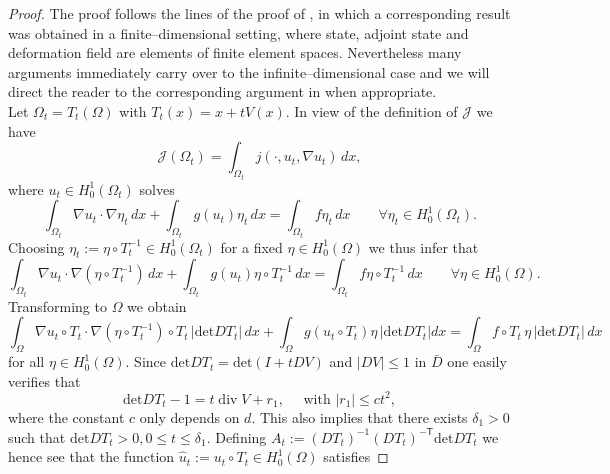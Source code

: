 \documentclass[a4paper,10pt]{article}
\newcommand{\dx}{\,dx}
\theoremstyle{plain}
\theoremstyle{plain}
\numberwithin{equation}{section}
\DeclareMathOperator{\Div}{div}
\begin{document}
\begin{proof}
The proof follows the lines of the proof of \cite[Lemma 3.2]{DHH25-convergence}, in which
a corresponding result was obtained in a finite--dimensional setting, where
state, adjoint state and deformation field are elements of finite element spaces. 
Nevertheless many arguments immediately carry over to the infinite--dimensional case and
we will direct the reader to the corresponding argument in \cite{DHH25-convergence}
when appropriate. \\
Let $\Omega_t=T_t(\Omega)$ with $T_t(x)=x+t V(x)$. In view of the definition of $\mathcal J$
we have
\begin{displaymath}
\mathcal J(\Omega_t) = \int_{\Omega_t} j(\cdot,u_t,\nabla u_t)  \dx,
\end{displaymath}
where $u_t \in H^1_0(\Omega_t)$ solves
\begin{displaymath}  
\int_{\Omega_t} \nabla u_t \cdot \nabla \eta_t  \dx + \int_{\Omega_t} g(u_t) \eta_t \dx = \int_{\Omega_t} f \eta_t  \dx \qquad \forall \eta_t \in H^1_0(\Omega_t).
\end{displaymath}
Choosing $\eta_t:= \eta \circ T_t^{-1} \in H^1_0(\Omega_t)$ for a fixed $\eta \in H^1_0(\Omega)$ we thus infer that 
\begin{equation}  \label{hatuht}
\int_{\Omega_t} \nabla u_t \cdot \nabla (\eta \circ T_t^{-1})  \dx + \int_{\Omega_t} g(u_t) \eta \circ T_t^{-1} \dx = \int_{\Omega_t} f \eta \circ T_t^{-1}  \dx \qquad
\forall  \eta \in H^1_0(\Omega).
\end{equation}
Transforming to $\Omega$ we obtain
\begin{equation} \label{uhtrel}
\int_{\Omega} \nabla u_t \circ T_t \cdot \nabla (\eta \circ T_t^{-1}) \circ T_t \, | \mbox{det} D T_t |  \dx + \int_{\Omega} g(u_t\circ T_t) \eta \, | \mbox{det} D T_t |dx =
\int_{\Omega} f \circ T_t \, \eta \, | \mbox{det} D T_t |  \dx 
\end{equation}
for all $\eta \in H^1_0(\Omega)$. Since $\mbox{det} DT_t = \mbox{det}(I+ t DV)$ and $| D V | \leq 1$ in $\bar D$ one easily
verifies that 
\begin{equation} \label{dif1}
\mbox{det} DT_t -1 = t {\Div} V + r_1, \quad \mbox{ with } | r_1 | \leq c t^2,
\end{equation}
where the constant $c$ only depends on $d$. This also implies that  there exists $\delta_1>0$ such
that $\mbox{det} DT_t >0, 0 \leq t \leq \delta_1$. Defining $A_t:= (DT_t)^{-1} (D T_t)^{- \mathsf{T}} \mbox{det} DT_t$ we hence see that the function
$\hat u_t:= u_t \circ T_t \in H^1_0(\Omega)$ satisfies

\end{proof}
\end{document}
